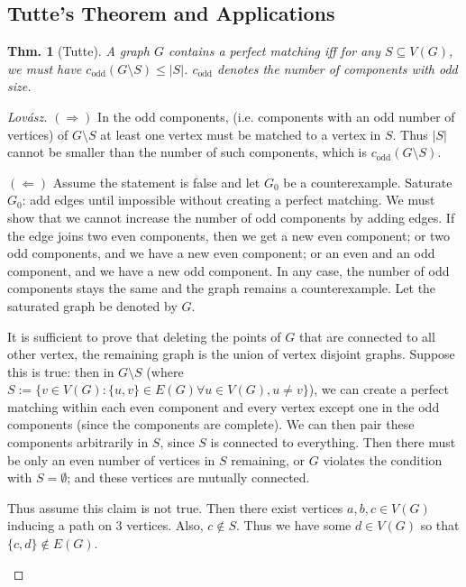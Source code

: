 \documentclass[12pt, a4paper]{book}
\newtheorem{theorem}{Thm.}[section]
\theoremstyle{nonumberplain}
\newtheorem{proof}{Proof}
\begin{document}
\subsection{Tutte's Theorem and Applications}
\begin{theorem}[Tutte]
    A graph $G$ contains a perfect matching iff for any $S\subseteq V(G)$, we must have $c_{\text{odd}}(G\setminus S)\leq |S|$.
    $c_{\text{odd}}$ denotes the number of components with odd size.
\end{theorem}
\begin{proof}[Lov\'asz]
    $(\Rightarrow)$ In the odd components, (i.e. components with an odd number of vertices) of $G\setminus S$ at least one vertex must be matched to a vertex in $S$.
    Thus $|S|$ cannot be smaller than the number of such components, which is $c_{\text{odd}}(G\setminus S)$.

    $(\Leftarrow)$ Assume the statement is false and let $G_0$ be a counterexample.
    Saturate $G_0$: add edges until impossible without creating a perfect matching.
    We must show that we cannot increase the number of odd components by adding edges.
    If the edge joins two even components, then we get a new even component; or two odd components, and we have a new even component; or an even and an odd component, and we have a new odd component.
    In any case, the number of odd components stays the same and the graph remains a counterexample.
    Let the saturated graph be denoted by $G$.

    It is sufficient to prove that deleting the points of $G$ that are connected to all other vertex, the remaining graph is the union of vertex disjoint graphs.
    Suppose this is true: then in $G\setminus S$ (where $S:=\{v\in V(G):\{u,v\}\in E(G)\forall u\in V(G),u\neq v\}$), we can create a perfect matching within each even component and every vertex except one in the odd components (since the components are complete).
    We can then pair these components arbitrarily in $S$, since $S$ is connected to everything.
    Then there must be only an even number of vertices in $S$ remaining, or $G$ violates the condition with $S=\emptyset$; and these vertices are mutually connected.

    Thus assume this claim is not true.
    Then there exist vertices $a,b,c\in V(G)$ inducing a path on $3$ vertices.
    Also, $c\notin S$.
    Thus we have some $d\in V(G)$ so that $\{c,d\}\notin E(G)$.
    \begin{center}
\end{center}
\end{proof}
\end{document}
